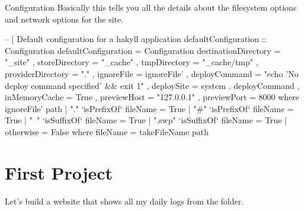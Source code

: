 \documentclass[openany, 12pt]{article}
\begin{document}
\begin{definition}{Configuration}{}
	Basically this tells you all the details about the filesystem options and
	network options for the site.

	\begin{haskell}{}
-- | Default configuration for a hakyll application
defaultConfiguration :: Configuration
defaultConfiguration = Configuration
    { destinationDirectory = "_site"
    , storeDirectory       = "_cache"
    , tmpDirectory         = "_cache/tmp"
    , providerDirectory    = "."
    , ignoreFile           = ignoreFile'
    , deployCommand        = "echo 'No deploy command specified' && exit 1"
    , deploySite           = system . deployCommand
    , inMemoryCache        = True
    , previewHost          = "127.0.0.1"
    , previewPort          = 8000
    }
  where
    ignoreFile' path
        | "."    `isPrefixOf` fileName = True
        | "#"    `isPrefixOf` fileName = True
        | "~"    `isSuffixOf` fileName = True
        | ".swp" `isSuffixOf` fileName = True
        | otherwise                    = False
      where
          fileName = takeFileName path
\end{haskell}
\end{definition}

\section{First Project}
Let's build a website that shows all my daily logs from the
 folder.

\printindex{}
\end{document}
